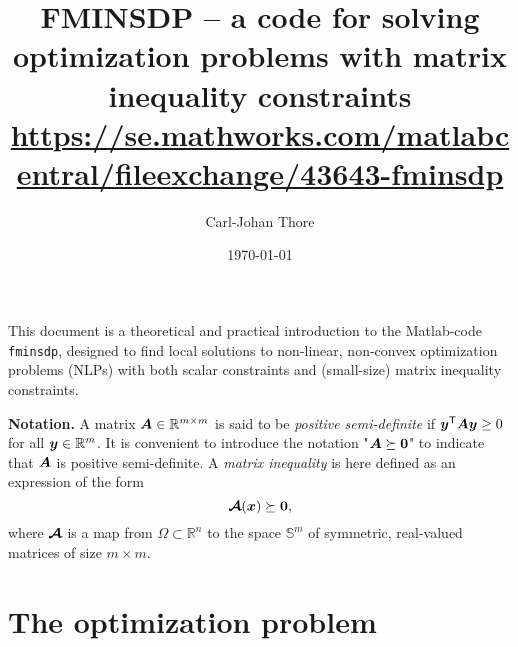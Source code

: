 \documentclass{article}
\title{FMINSDP -- a code for solving optimization problems with matrix inequality constraints \vskip 2mm
\footnotesize{\url{https://se.mathworks.com/matlabcentral/fileexchange/43643-fminsdp}} \normalsize}
\date{\today}
\author{Carl-Johan Thore}
\newcommand{\bm}[1]{\mbox{\boldmath $#1$}}
\newcommand{\T}{\textsf{T}}
\begin{document}
\maketitle

\thispagestyle{empty}

\noindent This document is a theoretical and practical introduction to the Matlab-code \texttt{fminsdp}, designed to find local solutions to non-linear, non-convex optimization problems (NLPs) with both scalar constraints and (small-size) matrix inequality constraints. 
\vskip 2mm

\noindent \textbf{Notation.} A matrix $\bm{A} \in \mathbb{R}^{m \times m}$ is said to be \textit{positive semi-definite} if 
$\bm{y}^{\T}\bm{A}\bm{y} \geq 0$ for all $\bm{y} \in \mathbb{R}^{m}$. It is convenient to introduce
the notation "$\bm{A} \succeq \bm{0}$" to indicate that $\bm{A}$ is positive semi-definite. A \textit{matrix inequality} is here
defined as an expression of the form
\begin{equation}\label{eq:matrix_ineq}
\bm{\mathcal{A}}(\bm{x}) \succeq \bm{0},
\end{equation}
where $\bm{\mathcal{A}}$ is a map from $\Omega \subset \mathbb{R}^{n}$ to the space $\mathbb{S}^{m}$ of symmetric, real-valued matrices of size $m \times m$.




\section{The optimization problem}
\end{document}
